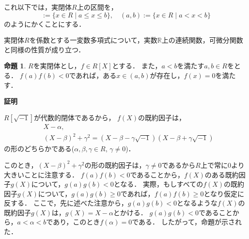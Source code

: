 \documentclass[uplatex, dvipdfmx]{jsarticle}
\makeatletter
\numberwithin{equation}{section}
\renewenvironment{proof}[1][\proofname]{\par
  \pushQED{\qed}%
  \normalfont \topsep6\p@\@plus6\p@\relax
  \trivlist
  \item\relax
  {\bfseries
  #1\@addpunct{.}}\hspace\labelsep\ignorespaces
}{
  \popQED\endtrivlist\@endpefalse
}
\newcommand{\R}{\mathbb{R}}
\theoremstyle{definition}
\newtheorem{proposition}[definition]{命題}
\renewcommand{\proofname}{\textbf{証明}}
\makeatother
\begin{document}
これ以下では，実閉体$R$上の区間を，
\begin{equation}
     [a,b]:=\{x \in R \mid a \leq x \leq b\}, \quad (a,b):=\{x \in R \mid a < x < b\}
\end{equation}
のようにかくことにする．

実閉体$R$を係数とする一変数多項式について，実数$\R$上の連続関数，可微分関数と同様の性質が成り立つ．

\begin{proposition}\label{proposition:intermediate}
     $R$を実閉体とし，$f \in R[X]$とする．
     また，$a<b$を満たす$a,b \in R$をとる．
     $f(a)f(b)<0$であれば，ある$x \in (a,b)$が存在し，$f(x)=0$を満たす．
\end{proposition}
\begin{proof}
     $R[\sqrt{-1}]$が代数的閉体であるから，
     $f(X)$の既約因子は，
     \begin{align}
          &X-\alpha, \\
          &(X-\beta)^2 + \gamma^2 = (X-\beta-\gamma\sqrt{-1})(X-\beta+\gamma\sqrt{-1})
     \end{align}
     の形のどちらかである($\alpha, \beta, \gamma \in R$, $\gamma \neq 0$)．

     このとき，$(X-\beta)^2 + \gamma^2$の形の既約因子は，$\gamma \neq 0$であるから$R$上で常に$0$より大きいことに注意する．
     $f(a)f(b)<0$であることから，$f(X)$のある既約因子$g(X)$について，$g(a)g(b)<0$となる．
     実際，もしすべての$f(X)$の既約因子$g(X)$について，$g(a)g(b) \geq 0$であれば，$f(a)f(b)\geq0$となり仮定に反する．
     ここで，先に述べた注意から，$g(a)g(b)<0$となるような$f(X)$の既約因子$g(X)$は，$g(X) = X - \alpha$とかける．
     $g(a)g(b) < 0$であることから，$a<\alpha<b$であり，このとき$f(\alpha)=0$である．
     したがって，命題が示された．
\end{proof}
\end{document}
